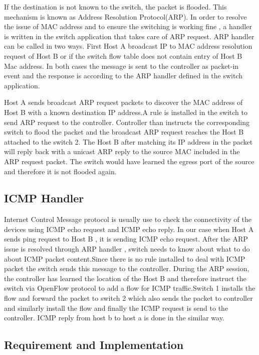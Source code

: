 If the destination is not known to the switch, the packet is flooded. This mechanism is known as Address Resolution Protocol(ARP). In order to resolve the issue of MAC address and to ensure the switching is working fine , a handler is written in the switch application that takes care of ARP request. ARP handler can be called in two ways. First Host A broadcast IP to MAC address resolution request of Host B or if the switch flow table does not contain entry of Host B Mac address. In both cases the message is sent to the controller as packet-in event and the response is according to the ARP handler defined in the switch application.

Host A sends broadcast ARP request packets to discover the MAC address of Host B with a known destination IP address.A rule is installed in the switch to send ARP request to the controller. Controller than instructs the corresponding switch to flood the packet and the broadcast ARP request reaches the Host B attached to the switch 2. The Host B after matching its IP address in the packet will reply back with a unicast ARP reply to the source MAC included in the ARP request packet. The switch would have learned the egress port of the source and therefore it is not flooded again.


\subsection{ICMP Handler}

Internet Control Message protocol is usually use to check the connectivity of the devices using ICMP echo request and ICMP echo reply. In our case when Host A sends ping request to Host B , it is sending ICMP echo request. After the ARP issue is resolved through ARP handler , switch needs to know about what to do about ICMP packet content.Since there is no rule installed to deal with ICMP packet the switch sends this message to the controller. During the ARP session, the controller has learned the location of the Host B and therefore instruct the switch via OpenFlow protocol to add a flow for ICMP traffic.Switch 1 installs the flow and forward the packet to switch 2 which also sends the packet to controller and similarly install the flow and finally the ICMP request is send to the controller. ICMP reply from host b to host a is done in the similar way.


\subsection{Requirement and Implementation }

